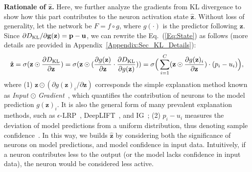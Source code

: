 \documentclass{article} \usepackage{iclr2024_conference,times}
\newcommand{\bfstart}[1]{\noindent\textbf{#1.}}
\begin{document}
\bfstart{Rationale of $\hat{\mathbf{z}}$} Here, we further analyze the gradients from KL divergence to show how this part contributes to the neuron activation state $\hat{\mathbf{z}}$. 
Without loss of generality, let the network be $F = f \circ g$, where $g(\cdot)$ is the predictor following $\mathbf{z}$. 
Since $\partial D_{\rm KL} / \partial \mathbf{g(\mathbf{z})} = \mathbf{p}-\mathbf{u}$, we can rewrite the Eq.~(\ref{Eq:State}) as follows (more details are provided in Appendix~\ref{Appendix:Sec_KL_Details}):
\vspace{-1mm}
\begin{equation}
	\hat{\mathbf{z}} = \sigma(\mathbf{z} \odot \frac{\partial{D_{\rm KL}}}{\partial \mathbf{z}}) = 
	\sigma(\mathbf{z} \odot (\frac{\partial g(\mathbf{z})}{\partial \mathbf{z}} \cdot \frac{\partial{D_{\rm KL}}}{\partial g(\mathbf{z})})) = 
	\sigma \Big(\sum_{i=1}^{C} (\mathbf{z} \odot \frac{\partial g(\mathbf{z})_i}{\partial \mathbf{z}}) \cdot (p_i - u_i) \Big),
\vspace{-1mm}
\label{Eq:rational_z}
\end{equation}
where 
(1) $\mathbf{z} \odot ({\partial g(\mathbf{z})_i} / {\partial \mathbf{z}})$ corresponds the simple explanation method known as \textit{Input} $\odot$ \textit{Gradient}~\citep{exp:inputXgrad}, which quantifies the contribution of neurons to the model prediction $g(\mathbf{z})_i$. 
It is also the general form of many prevalent explanation methods, such as $\epsilon$-LRP~\citep{exp:LRP}, DeepLIFT~\citep{exp:DeepLIFT}, and IG~\citep{exp:IG}; 
(2) $p_i - u_i$ measures the deviation of model predictions from a uniform distribution, thus denoting sample confidence~\citep{OOD_Detect:GradNorm}.
In this way, we builds $\hat{\mathbf{z}}$ by considering both the significance of neurons on model predictions, and model confidence in input data.
Intuitively, if a neuron contributes less to the output (or the model lacks confidence in input data), the neuron would be considered less active.


























\vspace{-1mm}
\end{document}
